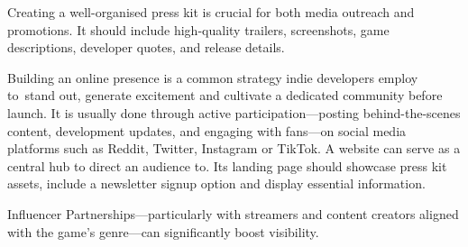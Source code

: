 Creating a well-organised press kit is crucial for both media outreach and promotions. It should include high-quality trailers, screenshots, game descriptions, developer quotes, and release details.
\cite{impress_press-kit}

Building an online presence is a common strategy indie developers employ to~stand out, generate excitement and cultivate a dedicated community before launch. It is usually done through active participation---posting behind-the-scenes content, development updates, and engaging with fans---on social media platforms such as Reddit, Twitter, Instagram or TikTok. A website can serve as a central hub to direct an audience to. Its landing page should showcase press kit assets, include a newsletter signup option and display essential information.
\cite{venkatesh_successful-release}

Influencer Partnerships---particularly with streamers and content creators aligned with the game’s genre---can significantly boost visibility.
\cite{developer_introduction-to-marketing}

